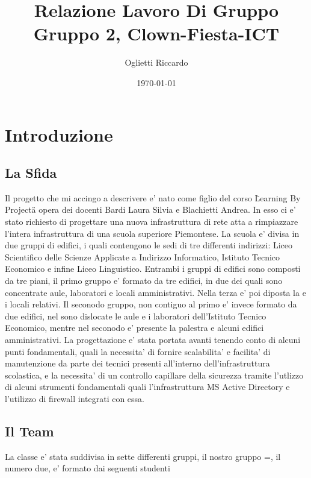 \documentclass{report}
\author{Oglietti Riccardo}
\title{Relazione Lavoro Di Gruppo\\
\large Gruppo 2, Clown-Fiesta-ICT}
\date{\today}
\begin{document}
    \maketitle
    \chapter{Introduzione}
        \section{La Sfida}
            Il progetto che mi accingo a descrivere e' nato come figlio del corso \"Learning By Project\" a opera dei docenti\nolinebreak
             Bardi Laura Silvia e Blachietti Andrea. In esso ci e' stato richiesto di progettare una nuova infrastruttura di\nolinebreak
             rete atta a rimpiazzare l'intera infrastruttura di una scuola superiore Piemontese. La scuola e' divisa in due\nolinebreak
             gruppi di edifici, i quali contengono le sedi di tre differenti indirizzi: Liceo Scientifico delle Scienze\nolinebreak
             Applicate a Indirizzo Informatico, Istituto Tecnico Economico e infine Liceo Linguistico.
            Entrambi i gruppi di edifici sono composti da tre piani, il primo gruppo e' formato da tre edifici, in due\nolinebreak
             dei quali sono concentrate aule, laboratori e locali amministrativi. Nella terza e' poi diposta la\nolinebreak
             e i locali relativi.
            Il seconodo gruppo, non contiguo al primo e' invece formato da due edifici, nel sono dislocate le aule e\nolinebreak
             i laboratori dell'Istituto Tecnico Economico, mentre nel seconodo e' presente la palestra e alcuni edifici\nolinebreak
             amministrativi.
            La progettazione e' stata portata avanti tenendo conto di alcuni punti fondamentali, quali la necessita' di\nolinebreak
             fornire scalabilita' e facilita' di manutenzione da parte dei tecnici presenti all'interno dell'infrastruttura\nolinebreak
             scolastica, e la necessita' di un controllo capillare della sicurezza tramite l'utlizzo di alcuni strumenti\nolinebreak
             fondamentali quali l'infrastruttura MS Active Directory e l'utilizzo di firewall integrati con essa.
        \section{Il Team}
            La classe e' stata suddivisa in sette differenti gruppi, il nostro gruppo =, il numero due, e' formato dai\nolinebreak
             seguenti studenti
\end{document}
